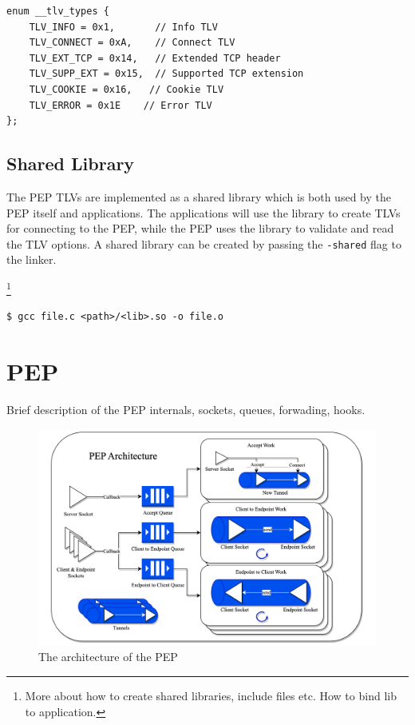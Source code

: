 \documentclass[a4paper,english, 11pt]{report}
\begin{document}
\begin{verbatim}
enum __tlv_types {
    TLV_INFO = 0x1,    	  // Info TLV
    TLV_CONNECT = 0xA,    // Connect TLV          
    TLV_EXT_TCP = 0x14,   // Extended TCP header
    TLV_SUPP_EXT = 0x15,  // Supported TCP extension
    TLV_COOKIE = 0x16,   // Cookie TLV
    TLV_ERROR = 0x1E    // Error TLV
};
\end{verbatim}

\subsection{Shared Library}
The PEP TLVs are implemented as a shared library which is both used by the PEP itself and applications. The applications will use the library to create TLVs for connecting to the PEP, while the PEP uses the library to validate and read the TLV options. 
A shared library can be created by passing the \verb|-shared| flag to the linker.

\footnote{More about how to create shared libraries, include files etc. How to bind lib to application.}

\begin{verbatim}
$ gcc file.c <path>/<lib>.so -o file.o
\end{verbatim}

\section{PEP}
Brief description of the PEP internals, sockets, queues, forwading, hooks.

\begin{figure} %
	\centering
	\includegraphics[scale=0.35]{../diagrams/drawio/pep_architecture.png}
  	\caption{The architecture of the PEP}
  	\label{fig:pep_architecture}
\end{figure}
\end{document}
